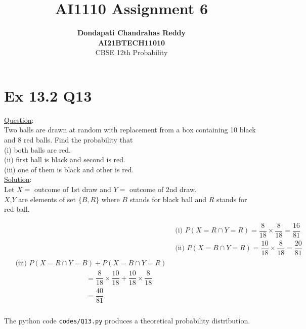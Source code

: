 \documentclass[journal,12pt,twocolumn]{IEEEtran}
\begin{document}
\title{\textbf{AI1110 Assignment 6} }
\author{\textbf{Dondapati Chandrahas Reddy}\\\textbf{AI21BTECH11010}\\ CBSE 12th Probability}
\maketitle

{\section{Ex 13.2 Q13}}

{\large \underline{Question}}:\\

Two balls are drawn at random with replacement from a box containing 10 black
and 8 red balls. Find the probability that\\
(i) both balls are red.\\
(ii) first ball is black and second is red.\\
(iii) one of them is black and other is red.\\

{\large \underline{Solution}:}\\

Let $X=$ outcome of 1st draw and $Y=$ outcome of 2nd draw.\\

$X$,$Y$ are elements of set $\{B,R\}$ where $B$ stands for black ball and $R$ stands for red ball.

\begin{align}
	&\text{(i) } P(X=R \cap Y=R) = \dfrac{8}{18} \times \dfrac{8}{18}  = \dfrac{16}{81}\\[1em]
	&\text{(ii) } P(X=B \cap Y=R) = \dfrac{10}{18} \times \dfrac{8}{18}  = \dfrac{20}{81}\\[1em]
	\begin{split}
	&\text{(iii) } P(X=R \cap Y=B) + P(X=B \cap Y=R)\\[1ex]
	& \hspace{120pt} = \dfrac{8}{18} \times \dfrac{10}{18} + \dfrac{10}{18} \times \dfrac{8}{18}\\[1ex]
	&  \hspace{120pt} = \dfrac{40}{81} 
	\end{split}
\end{align}\\

The python code \texttt{codes/Q13.py} produces a theoretical probability distribution.
\end{document}
